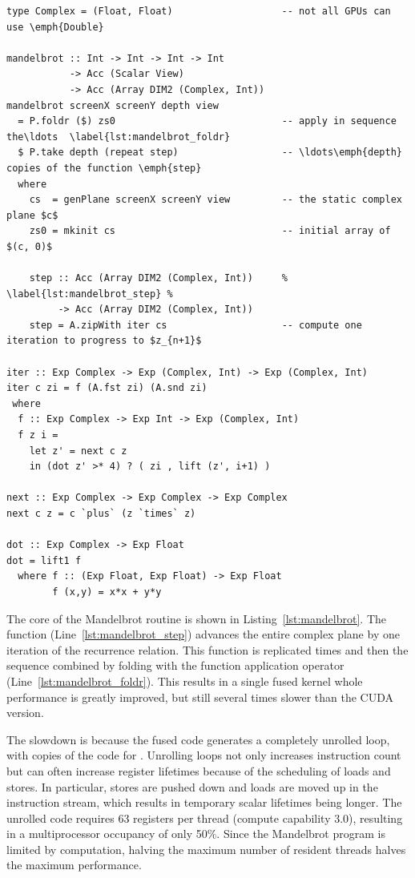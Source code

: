 \begin{lstlisting}[style=haskell
    ,float=tbh
    ,label=lst:mandelbrot
    ,caption={Mandelbrot set generator in Accelerate}]
type Complex = (Float, Float)                   -- not all GPUs can use \emph{Double}

mandelbrot :: Int -> Int -> Int -> Int
           -> Acc (Scalar View)
           -> Acc (Array DIM2 (Complex, Int))
mandelbrot screenX screenY depth view
  = P.foldr ($) zs0                             -- apply in sequence the\ldots  \label{lst:mandelbrot_foldr}
  $ P.take depth (repeat step)                  -- \ldots\emph{depth} copies of the function \emph{step}
  where
    cs  = genPlane screenX screenY view         -- the static complex plane $c$
    zs0 = mkinit cs                             -- initial array of $(c, 0)$

    step :: Acc (Array DIM2 (Complex, Int))     % \label{lst:mandelbrot_step} %
         -> Acc (Array DIM2 (Complex, Int))
    step = A.zipWith iter cs                    -- compute one iteration to progress to $z_{n+1}$

iter :: Exp Complex -> Exp (Complex, Int) -> Exp (Complex, Int)
iter c zi = f (A.fst zi) (A.snd zi)
 where
  f :: Exp Complex -> Exp Int -> Exp (Complex, Int)
  f z i =
    let z' = next c z
    in (dot z' >* 4) ? ( zi , lift (z', i+1) )

next :: Exp Complex -> Exp Complex -> Exp Complex
next c z = c `plus` (z `times` z)

dot :: Exp Complex -> Exp Float
dot = lift1 f
  where f :: (Exp Float, Exp Float) -> Exp Float
        f (x,y) = x*x + y*y
\end{lstlisting}

The core of the Mandelbrot routine is shown in Listing~\ref{lst:mandelbrot}. The
function  (Line~\ref{lst:mandelbrot_step}) advances the entire
complex plane by one iteration of the recurrence relation. This function is
replicated  times and then the sequence combined by folding with the
function application operator \code{(\$)} (Line~\ref{lst:mandelbrot_foldr}). This
results in a single fused kernel whole performance is greatly improved, but
still several times slower than the CUDA version.

The slowdown is because the fused code generates a completely unrolled loop,
with  copies of the code for . Unrolling loops not
only increases instruction count but can often increase register lifetimes
because of the scheduling of loads and stores. In particular, stores are pushed
down and loads are moved up in the instruction stream, which results in
temporary scalar lifetimes being longer. The unrolled code requires 63 registers
per thread (compute capability 3.0), resulting in a multiprocessor occupancy of
only 50\%. Since the Mandelbrot program is limited by computation, halving the
maximum number of resident threads halves the maximum performance.

